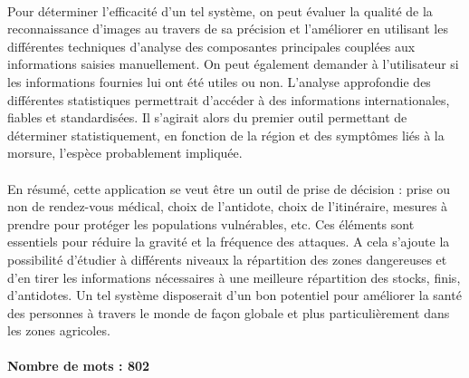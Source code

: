 \documentclass[10pt, conference, compsocconf]{llncs}
\begin{document}
\\
Pour déterminer l'efficacité d'un tel système, on peut évaluer la qualité de la reconnaissance d'images au travers de sa précision et l'améliorer en utilisant les différentes techniques d'analyse des composantes principales couplées aux informations saisies manuellement. On peut également demander à l'utilisateur si les informations fournies lui ont été utiles ou non. L'analyse approfondie des différentes statistiques permettrait d'accéder à des informations internationales, fiables et standardisées. Il s'agirait alors du premier outil permettant de déterminer statistiquement, en fonction de la région et des symptômes liés à la morsure, l'espèce probablement impliquée. \\
\\
En résumé, cette application se veut être un outil de prise de décision : prise ou non de rendez-vous médical, choix de l'antidote, choix de l'itinéraire, mesures à prendre pour protéger les populations vulnérables, etc. Ces éléments sont essentiels pour réduire la gravité et la fréquence des attaques. A cela s'ajoute la possibilité d'étudier à différents niveaux la répartition des zones dangereuses et d'en tirer les informations nécessaires à une meilleure répartition des stocks, finis, d'antidotes. Un tel système disposerait d'un bon potentiel pour améliorer la santé des personnes à travers le monde de façon globale et plus particulièrement dans les zones agricoles.\\
\\
\textbf{Nombre de mots : 802}
\\ 

\end{document}
